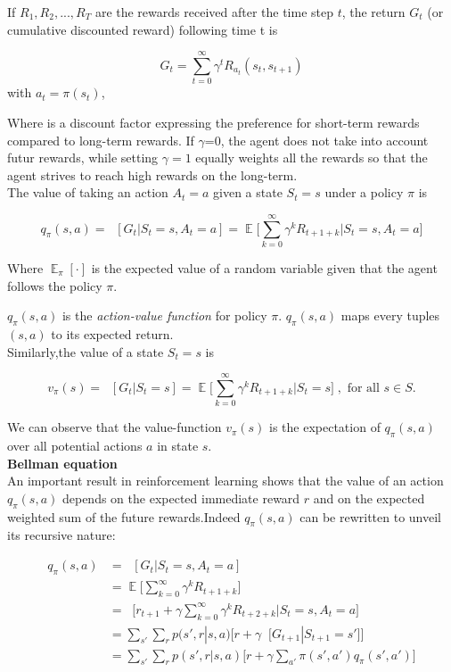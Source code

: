 \documentclass[11pt, onecolumn, a4paper]{report}
\begin{document}
If $R_1,R_2,...,R_T$ are the rewards received after the time step $t$, the return $G_t$ (or cumulative discounted reward) following time t is

\begin{center}
$$G_t = \sum^{\infty}_{t=0} {\gamma^t R_{a_t} (s_t, s_{t+1})}$$ with
$a_t = \pi(s_t)$,
\end{center}
Where \gamma is a discount factor expressing the preference for short-term rewards compared to long-term rewards. If $\gamma$=0, the agent does not take into account futur rewards, while setting $\gamma=1$ equally weights all the rewards so that the agent  strives to reach high rewards on the long-term.\\

The value of taking an action $A_t=a$ given a state $S_t=s$ under a policy $\pi$ is 

$$q_\pi(s,a) = \mathop{\mathbb{E_\pi}}[G_t | S_t=s,A_t=a] = \mathop{\mathbb{E}} \Bigg [\sum^{\infty}_{k=0} {\gamma^{k} R_{t+1+k}} \Big | S_t=s,A_t=a \Bigg ]$$

Where $\mathop{\mathbb{E}}_{\pi}[\cdot]$ is the expected value of a random variable given that the agent follows the policy $\pi$.

$q_\pi(s,a)$ is the \textit{action-value function} for policy $\pi$. $q_\pi(s,a)$ maps every tuples $(s,a)$ to its expected return.\\

Similarly,the value of a state $S_t=s$ is 

$$v_\pi(s) = \mathop{\mathbb{E_\pi}}[G_t | S_t=s] = \mathop{\mathbb{E}} \Bigg [\sum^{\infty}_{k=0} {\gamma^{k} R_{t+1+k}} \Big | S_t=s \Bigg ] \; ,\text{ for all } s \in S.$$ 

We can observe that the value-function $v_\pi(s)$ is the expectation of $q_\pi(s,a)$ over all potential actions $a$ in state $s$.\\

\textbf{Bellman equation}\\

An important result in reinforcement learning shows that the value of an action $q_\pi(s, a)$ depends on the expected immediate reward $r$ and on the expected weighted sum of the future rewards.Indeed $q_\pi(s, a)$ can be rewritten to unveil its recursive nature:

\begin{align}
q_\pi(s,a) & = \mathop{\mathbb{E_\pi}}[G_t | S_t=s,A_t=a] \nonumber \\
& = \mathop{\mathbb{E}} \Bigg [\sum^{\infty}_{k=0} {\gamma^{k} R_{t+1+k}} \Bigg ] \nonumber \\
& = \mathop{\mathbb{E_\pi}} \Bigg [r_{t+1}+\gamma\sum^{\infty}_{k=0} {\gamma^{k} R_{t+2+k}} \Bigg | S_t=s,A_t=a \Bigg ] \nonumber\\
& = \sum_{s'}\sum_{r}p(s',r|s,a) \Bigg [r + \gamma\mathop{\mathbb{E_\pi}} \Big [G_{t+1} | S_{t+1}=s' \Big] \Bigg] \nonumber \\
& = \sum_{s'}\sum_{r}p(s',r|s,a) \Bigg [r + \gamma \sum_{a'} \pi(s',a')q_\pi(s',a') \Bigg ]
\end{align}
\end{document}

